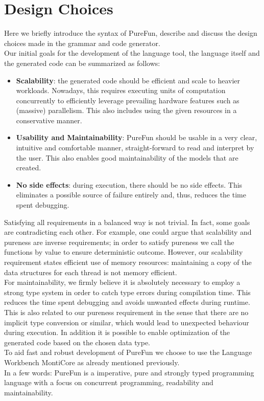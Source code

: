 \section{Design Choices}

Here we briefly introduce the syntax of PureFun, describe and discuss the design choices made in the grammar and code generator.\\
Our initial goals for the development of the language tool, the language itself and the generated code can be summarized as follows:
\begin{itemize}
	\item \textbf{Scalability}: the generated code should be efficient and scale to heavier workloads. Nowadays, this requires executing units of computation concurrently to efficiently leverage prevailing hardware features such as (massive) parallelism. This also includes using the given resources in a conservative manner. 
	\item \textbf{Usability and Maintainability}: PureFun should be usable in a very clear, intuitive and comfortable manner, straight-forward to read and interpret by the user. This also enables good maintainability of the models that are created.
	\item \textbf{No side effects}: during execution, there should be no side effects. This eliminates a possible source of failure entirely and, thus, reduces the time spent debugging.
\end{itemize}
Satisfying all requirements in a balanced way is not trivial. In fact, some goals are contradicting each other. For example, one could argue that scalability and pureness are inverse requirements; in order to satisfy pureness we call the functions by value to ensure deterministic outcome. However, our scalability requirement states efficient use of memory resources: maintaining a copy of the data structures for each thread is not memory efficient.\\
For maintainability, we firmly believe it is absolutely necessary to employ a strong type system in order to catch type errors during compilation time. This reduces the time spent debugging and avoids unwanted effects during runtime. This is also related to our pureness requirement in the sense that there are no implicit type conversion or similar, which would lead to unexpected behaviour during execution. In addition it is possible to enable optimization of the generated code based on the chosen data type.\\
To aid fast and robust development of PureFun we choose to use the Language Workbench MontiCore as already mentioned previously.\\
In a few words: PureFun is a imperative, pure and strongly typed programming language with a focus on concurrent programming, readability and maintainability.


